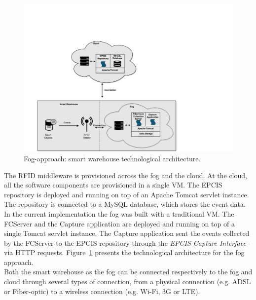 \begin{figure}[ht!]
  \centering
  \includegraphics[width=\textwidth]{./images/implementation_fog_architecture}
  \caption[Fog-approach: technological architecture.]{Fog-approach: smart warehouse technological architecture.}
  \label{fig:implementation_fog_architecture}
\end{figure}

The \gls{RFID} middleware is provisioned across the fog and the cloud. At the cloud,
all the software components are provisioned in a single \gls{VM}. The \gls{EPCIS} repository is deployed
and running on top of an Apache Tomcat servlet instance. The repository is connected to a MySQL
database, which stores the event data. In the current implementation the fog was built with a traditional
\gls{VM}. The \gls{FCServer} and the Capture application are deployed and running on top of a single
Tomcat servlet instance. The Capture application sent the events collected by the \gls{FCServer} to
the \gls{EPCIS} repository through the \textit{\gls{EPCIS} Capture Interface} - via \gls{HTTP} requests.
Figure~\ref{fig:implementation_fog_architecture} presents the technological architecture for the fog
approach.\\

Both the smart warehouse as the fog can be connected respectively to the fog and cloud through several
types of connection, from a physical connection (e.g. \gls{ADSL} or Fiber-optic) to a wireless connection
(e.g. Wi-Fi, 3G or \gls{LTE}).
